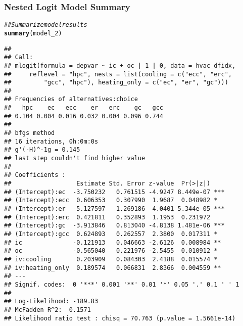\documentclass{beamer}\usepackage[]{graphicx}\usepackage[]{color}
\makeatletter
\newcommand{\hlcom}[1]{\textcolor[rgb]{0.678,0.584,0.686}{\textit{#1}}}%
\newcommand{\hlstd}[1]{\textcolor[rgb]{0.345,0.345,0.345}{#1}}%
\newcommand{\hlkwd}[1]{\textcolor[rgb]{0.737,0.353,0.396}{\textbf{#1}}}%
\newenvironment{kframe}{%
 \def\at@end@of@kframe{}%
 \ifinner\ifhmode%
  \def\at@end@of@kframe{\end{minipage}}%
  \begin{minipage}{\columnwidth}%
 \fi\fi%
 \def\FrameCommand##1{\hskip\@totalleftmargin \hskip-\fboxsep
 \colorbox{shadecolor}{##1}\hskip-\fboxsep
     \hskip-\linewidth \hskip-\@totalleftmargin \hskip\columnwidth}%
 \MakeFramed {\advance\hsize-\width
   \@totalleftmargin\z@ \linewidth\hsize
   \@setminipage}}%
 {\par\unskip\endMakeFramed%
 \at@end@of@kframe}
\newenvironment{knitrout}{}{} %
\makeatother
\begin{document}
\begin{frame}[fragile]\frametitle{Nested Logit Model Summary}
    \vspace{1ex}
\begin{knitrout}\tiny
{}\color{fgcolor}\begin{kframe}
\begin{alltt}
\hlcom{## Summarize model results}
\hlkwd{summary}\hlstd{(model_2)}
\end{alltt}
\begin{verbatim}
## 
## Call:
## mlogit(formula = depvar ~ ic + oc | 1 | 0, data = hvac_dfidx, 
##     reflevel = "hpc", nests = list(cooling = c("ecc", "erc", 
##         "gcc", "hpc"), heating_only = c("ec", "er", "gc")))
## 
## Frequencies of alternatives:choice
##   hpc    ec   ecc    er   erc    gc   gcc 
## 0.104 0.004 0.016 0.032 0.004 0.096 0.744 
## 
## bfgs method
## 16 iterations, 0h:0m:0s 
## g'(-H)^-1g = 0.145 
## last step couldn't find higher value 
## 
## Coefficients :
##                  Estimate Std. Error z-value  Pr(>|z|)    
## (Intercept):ec  -3.750232   0.761515 -4.9247 8.449e-07 ***
## (Intercept):ecc  0.606353   0.307990  1.9687  0.048982 *  
## (Intercept):er  -5.127597   1.269186 -4.0401 5.344e-05 ***
## (Intercept):erc  0.421811   0.352893  1.1953  0.231972    
## (Intercept):gc  -3.913846   0.813040 -4.8138 1.481e-06 ***
## (Intercept):gcc  0.624893   0.262557  2.3800  0.017311 *  
## ic              -0.121913   0.046663 -2.6126  0.008984 ** 
## oc              -0.565040   0.221976 -2.5455  0.010912 *  
## iv:cooling       0.203909   0.084303  2.4188  0.015574 *  
## iv:heating_only  0.189574   0.066831  2.8366  0.004559 ** 
## ---
## Signif. codes:  0 '***' 0.001 '**' 0.01 '*' 0.05 '.' 0.1 ' ' 1
## 
## Log-Likelihood: -189.83
## McFadden R^2:  0.1571 
## Likelihood ratio test : chisq = 70.763 (p.value = 1.5661e-14)
\end{verbatim}
\end{kframe}
\end{knitrout}
\end{frame}
\end{document}
